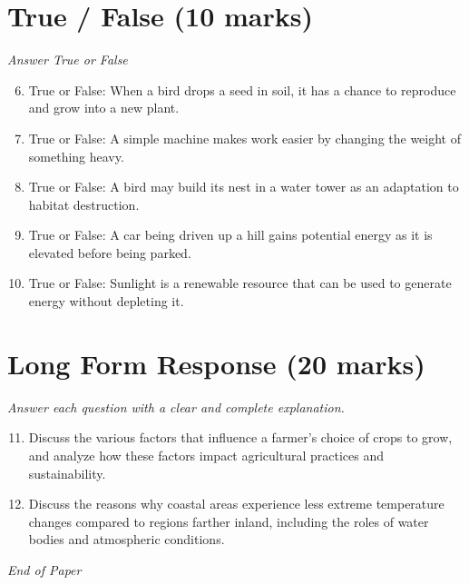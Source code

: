 \documentclass[12pt]{article}
\begin{document}
\section*{True / False (10 marks)}
\textit{Answer True or False}
\begin{enumerate}[label=\arabic*.]
\setcounter{enumi}{5}
\item True or False: When a bird drops a seed in soil, it has a chance to reproduce and grow into a new plant.
\item True or False: A simple machine makes work easier by changing the weight of something heavy.
\item True or False: A bird may build its nest in a water tower as an adaptation to habitat destruction.
\item True or False: A car being driven up a hill gains potential energy as it is elevated before being parked.
\item True or False: Sunlight is a renewable resource that can be used to generate energy without depleting it.
\end{enumerate}

\section*{Long Form Response (20 marks)}
\textit{Answer each question with a clear and complete explanation.}
\begin{enumerate}[label=\arabic*.]
\setcounter{enumi}{10}
\item Discuss the various factors that influence a farmer's choice of crops to grow, and analyze how these factors impact agricultural practices and sustainability.
\item Discuss the reasons why coastal areas experience less extreme temperature changes compared to regions farther inland, including the roles of water bodies and atmospheric conditions.
\end{enumerate}

\vfill
\noindent\textit{End of Paper}
\end{document}
